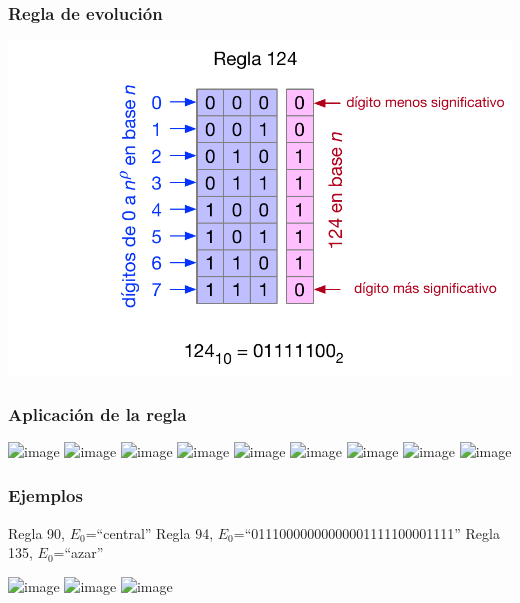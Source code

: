 \documentclass{beamer}
\begin{document}
\begin{frame}[t]
  \frametitle{Regla de evolución}
  \includegraphics[width=.9\textwidth]{automata4}
\end{frame}

\begin{frame}[t]
  \frametitle{Aplicación de la regla}
  \includegraphics<+>[width=.9\textwidth]{automata51}
  \includegraphics<+>[width=.9\textwidth]{automata52}
  \includegraphics<+>[width=.9\textwidth]{automata53}
  \includegraphics<+>[width=.9\textwidth]{automata54}
  \includegraphics<+>[width=.9\textwidth]{automata55}
  \includegraphics<+>[width=.9\textwidth]{automata56}
  \includegraphics<+>[width=.9\textwidth]{automata57}
  \includegraphics<+>[width=.9\textwidth]{automata58}
  \includegraphics<+>[width=.9\textwidth]{automata59}
\end{frame}

\begin{frame}[t]
  \frametitle{Ejemplos}
  \begin{center}
  \only<+> {Regla 90, $E_{0}$=``central'' }
  \only<+> {Regla 94, $E_{0}$=``01110000000000001111100001111'' }
  \only<+> {Regla 135, $E_{0}$=``azar'' }
  \end{center}
  \begin{center}
  \includegraphics<1>[height=.6\textheight]{ac11}
  \includegraphics<2>[height=.6\textheight]{ac12}
  \includegraphics<3>[height=.6\textheight]{ac13}
  \end{center}
\end{frame}
\end{document}
